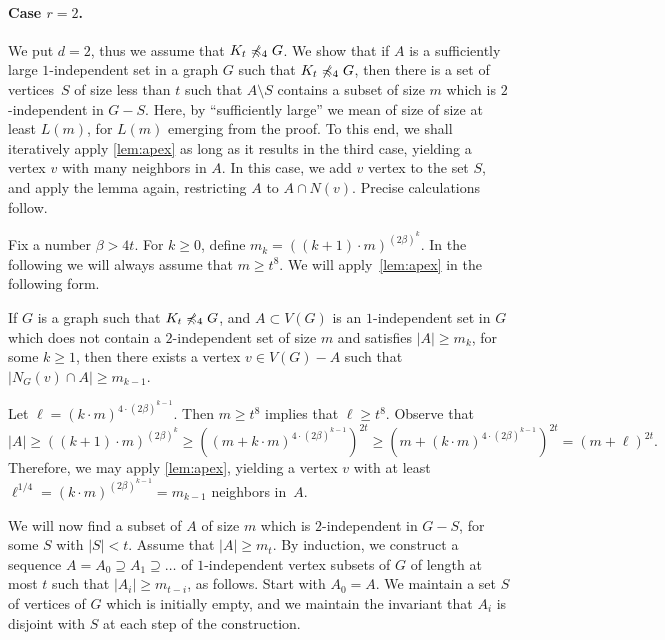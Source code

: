 \paragraph{Case $r=2$.}
We put $d=2$, thus we assume that $K_t\not\preccurlyeq_4 G$.
We show that if $A$ is a sufficiently large $1$-independent set in a graph $G$ such that $K_t\not\preccurlyeq_4 G$, 
then there is a set of vertices~$S$ of size less than $t$ such that $A\setminus S$ contains a subset of size $m$ which is $2$-independent in $G-S$. 
Here, by ``sufficiently large'' we mean of size of size at least $L(m)$, for $L(m)$ emerging from the proof.
To this end, we shall iteratively apply \cref{lem:apex} as long as  it results in the third case, 
yielding a vertex $v$ with many neighbors in $A$. In this case, we add $v$ vertex to the set $S$, and apply the lemma again,
restricting $A$ to $A\cap N(v)$. 
Precise calculations follow.

\newcommand{\mbull}{\widehat{m}}

Fix a number $\beta>4t$. For $k\ge 0$,
define $m_k=((k+1)\cdot m)^{(2\beta)^k}$.
In the following we will always assume that $m\geq t^8$. 
We will apply~\cref{lem:apex} in the following form.
\begin{claim}\label{cor:apex}
	If $G$ is a graph such that $K_t\not\preccurlyeq_4 G$, and
	$A\subset V(G)$ is an $1$-independent set in $G$ which does not contain a $2$-independent set of size $m$ and satisfies $|A|\ge m_k$, for some $k\geq 1$,
	then there exists a vertex $v\in V(G)-A$ such that $|N_G(v)\cap A| \ge m_{k-1}$.
\end{claim}
\begin{clproof}
Let $\ell=(k\cdot m)^{4\cdot(2\beta)^{k-1}}$.
Then $m\ge t^8$ implies that $\ell\ge t^8$.
Observe that
\[|A|\ge \left((k+1)\cdot m\right)^{(2\beta)^k}\ge\left ((m+ k\cdot m)^{4\cdot(2\beta)^{k-1}} \right)^{2t}
\ge \left(m+(k\cdot m)^{4\cdot (2\beta)^{k-1}}\right)^{2t}=(m+\ell)^{2t}.\]
Therefore, we may  apply \cref{lem:apex}, yielding a vertex $v$ with at least $\ell^{1/4}=(k\cdot m)^{(2\beta)^{k-1}}=m_{k-1}$ neighbors in~$A$.
\end{clproof}

We will now find 
a subset of $A$ of size $m$ which is $2$-independent in $G-S$, for some $S$ with $|S|<t$.
Assume that $|A|\ge m_t$. By induction, we
 construct a sequence  $A=A_0\supseteq A_1\supseteq\ldots$ 
of \mbox{$1$-independent} vertex subsets of $G$
of length at most $t$
such that $|A_i|\ge m_{t-i}$,
 as follows. Start with $A_0=A$. We maintain a set $S$ of vertices of $G$ which is initially empty, and we maintain the invariant that $A_i$ is disjoint with $S$ at each step of the construction.

